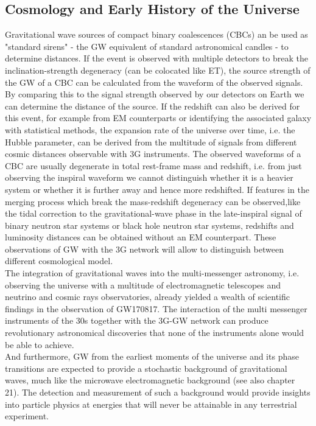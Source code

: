\documentclass[graybox, nosecnum]{svmult}
\begin{document}
\subsection{Cosmology and Early History of the Universe}
Gravitational wave sources of compact binary coalescences (CBCs) an be used as "standard sirens" - the GW equivalent of standard astronomical candles - to determine distances. 
 If the event is observed with multiple detectors to break the inclination-strength degeneracy (can be colocated like ET), the source strength of the GW of a CBC can be calculated from the waveform of the observed signals. By comparing this to the signal strength observed by our detectors on Earth we can determine the distance of the source.  If the redshift can also be derived for this event, for example from EM counterparts or identifying the associated galaxy with statistical methods, the expansion rate of the universe over time, i.e. the Hubble parameter, can be derived from the multitude of signals from different cosmic distances observable with 3G instruments.
 The  observed waveforms of a CBC are usually degenerate in total rest-frame mass and redshift, i.e. from just observing the inspiral waveform we cannot distinguish whether it is a heavier system or whether it is further away and hence more redshifted. If features in the merging process which break the mass-redshift degeneracy can be observed,like the tidal correction to the gravitational-wave phase in the late-inspiral signal of binary neutron star systems or black hole neutron star systems, redshifts and luminosity distances can be obtained without an EM counterpart. 
 These observations of GW with the 3G network will allow to distinguish between different cosmological model.
\\

The integration of gravitational waves into the multi-messenger astronomy, i.e. observing the universe with a multitude of electromagnetic telescopes and neutrino and cosmic rays observatories, already yielded a wealth of scientific findings in the observation of GW170817. The interaction of the multi messenger instruments of the 30s together with the 3G-GW network can produce revolutionary astronomical discoveries that none of the instruments alone would be able to achieve.
\\

And furthermore, GW from the earliest moments of the universe and its phase transitions are expected to provide a stochastic background of gravitational waves, much like the microwave electromagnetic background {\color{green} (see also chapter 21)}.  The detection and measurement of such a background would provide insights into particle physics at energies that will never be attainable in any terrestrial experiment.
\end{document}
